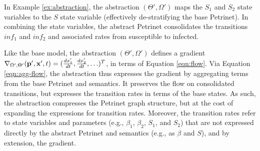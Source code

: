 In Example \ref{ex:abstraction}, the abstraction $(\Theta', \Omega')$ maps the $S_1$ and $S_2$ state variables to the $S$ state variable (effectively de-stratifying the base Petrinet).  In combining the state variables, the abstract Petrinet consolidates the transitions $inf_1$ and $inf_2$ and associated rates from susceptible to infected.  

Like the base model, the abstraction $(\Theta', \Omega')$ defines a gradient $\nabla_{\Omega', \Theta'}({\bf p}', {\bf x}', t) = (\frac{dx_1'}{dt},
\frac{dx_2'}{dt}, \ldots)^T$, in terms of Equation \ref{eqn:flow}.
Via Equation \ref{eqn:agg-flow}, the abstraction thus expresses the gradient by aggregating terms from the
base Petrinet and semantics.  It preserves the flow on consolidated transitions, but
expresses the transition rates in terms of the base states.  As such, the
abstraction compresses the Petrinet graph structure, but at the cost of
expanding the expressions for transition rates. Moreover, the transition
rates refer to state variables and parameters (e.g., $\beta_1$, $\beta_2$, $S_1$, and $S_2$) that are not expressed
directly by the abstract Petrinet and semantics (e.g., as $\beta$ and $S$), and by extension, the gradient. 

